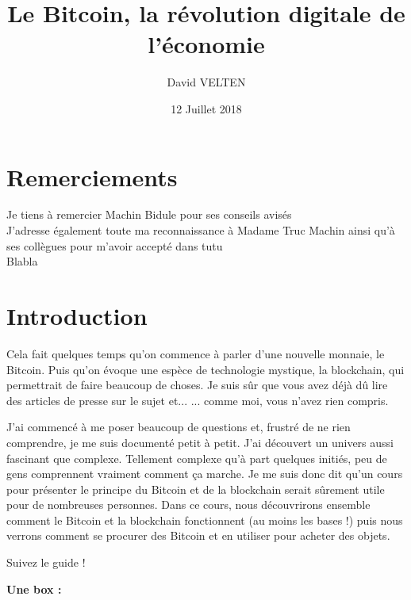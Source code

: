 \documentclass{bredele} %
\title{Le Bitcoin, la révolution digitale de l'économie}
\author{David VELTEN}
\date{12 Juillet 2018}
\begin{document}
    \maketitle

    \clearemptydoublepage
    \chapter{Remerciements}
    \thispagestyle{empty}
    Je tiens à remercier Machin Bidule pour ses conseils avisés \\
    J'adresse également toute ma reconnaissance à Madame Truc Machin ainsi qu'à ses collègues pour m'avoir accepté dans tutu \\
    Blabla

    \frontmatter
    \clearemptydoublepage
    \chapter{Introduction}

    Cela fait quelques temps qu'on commence à parler d'une nouvelle monnaie, le Bitcoin. Puis qu'on évoque une espèce de technologie mystique, la blockchain, qui permettrait de faire beaucoup de choses. Je suis sûr que vous avez déjà dû lire des articles de presse sur le sujet et...
    ... comme moi, vous n'avez rien compris.


    J'ai commencé à me poser beaucoup de questions et, frustré de ne rien comprendre, je me suis documenté petit à petit. J'ai découvert un univers aussi fascinant que complexe. Tellement complexe qu'à part quelques initiés, peu de gens comprennent vraiment comment ça marche. Je me suis donc dit qu'un cours pour présenter le principe du Bitcoin et de la blockchain serait sûrement utile pour de nombreuses personnes. Dans ce cours, nous découvrirons ensemble comment le Bitcoin et la blockchain fonctionnent (au moins les bases !) puis nous verrons comment se procurer des Bitcoin et en utiliser pour acheter des objets.

    Suivez le guide !

    \textbf{Une box : }

\end{document}

